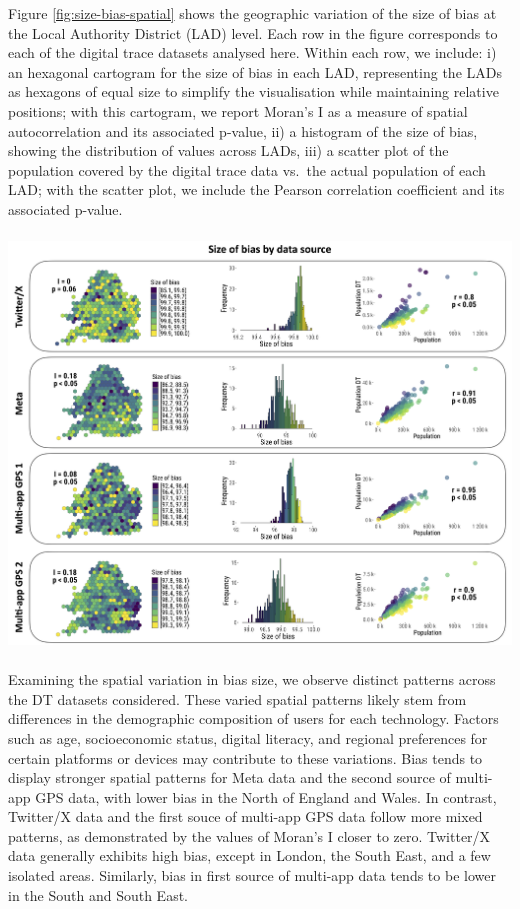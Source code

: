 \documentclass[]{rsos}%
\begin{document}
Figure \ref{fig:size-bias-spatial} shows the geographic variation of the
size of bias at the Local Authority District (LAD) level. Each row in
the figure corresponds to each of the digital trace datasets analysed
here. Within each row, we include: i) an hexagonal cartogram for the
size of bias in each LAD, representing the LADs as hexagons of equal
size to simplify the visualisation while maintaining relative positions;
with this cartogram, we report Moran's I as a measure of spatial
autocorrelation and its associated p-value, ii) a histogram of the size
of bias, showing the distribution of values across LADs, iii) a scatter
plot of the population covered by the digital trace data vs.~the actual
population of each LAD; with the scatter plot, we include the Pearson
correlation coefficient and its associated p-value.

\includegraphics[width=5.55208in,height=4.35417in]{figures/Fig-size-bias.png}

Examining the spatial variation in bias size, we observe distinct
patterns across the DT datasets considered. These varied spatial
patterns likely stem from differences in the demographic composition of
users for each technology. Factors such as age, socioeconomic status,
digital literacy, and regional preferences for certain platforms or
devices may contribute to these variations. Bias tends to display
stronger spatial patterns for Meta data and the second source of
multi-app GPS data, with lower bias in the North of England and Wales.
In contrast, Twitter/X data and the first souce of multi-app GPS data
follow more mixed patterns, as demonstrated by the values of Moran's I
closer to zero. Twitter/X data generally exhibits high bias, except in
London, the South East, and a few isolated areas. Similarly, bias in
first source of multi-app data tends to be lower in the South and South
East.
\end{document}
